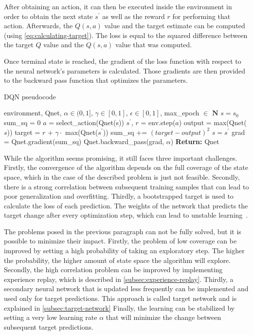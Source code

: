 \documentclass{article}
\begin{document}
After obtaining an action, it can then be executed inside the environment in order to obtain the next state $s^\prime$
as well as the reward $r$ for performing that action.
Afterwards, the $Q(s,a)$ value and the target estimate can be computed (using \autoref{eq:calculating-target}).
The loss is equal to the squared difference between the target $Q$ value and the $Q(s,a)$ value that was computed.

Once terminal state is reached, the gradient of the loss function with respect to the neural network's parameters is calculated.
Those gradients are then provided to the backward pass function that optimizes the parameters.


\begin{algorithm}
   \caption{DQN pseudocode}
   \begin{algorithmic}
      \REQUIRE environment, Qnet, $\alpha \in (0,1]$, $\gamma \in [0,1]$, $\epsilon \in [0,1]$, max\_epoch $\in$ $\mathbf{N}$
      \STATE $s = s_0$ 
         \STATE sum\_sq = 0
            \STATE $a$ = select\_action(Qnet(s))
            \STATE $s^\prime$, $r$ = env.step($a$)
            \STATE output = max(Qnet($s$))
            \STATE target = $r$ + $\gamma \cdot$ max(Qnet($s^\prime$))
            \STATE sum\_sq += $(target - output)^2$
            \STATE $s = s^\prime$
         \ENDWHILE
         \STATE grad = Qnet.gradient(sum\_sq)
         \STATE Qnet.backward\_pass(grad, $\alpha$)
      \ENDFOR
      \STATE \textbf{Return:} Qnet
   \end{algorithmic}
   \label{alg:dqn}
\end{algorithm}

While the algorithm seems promising, it still faces three important challenges.
Firstly, the convergence of the algorithm depends on the full coverage of the state space, which in the case of the described
problem is just not feasible.
Secondly, there is a strong correlation between subsequent training samples that can lead to poor generalization and overfitting.
Thirdly, a bootstrapped target is used to calculate the loss of each prediction.
The weights of the network that predicts the target change after every optimization step, which can lead to unstable learning~\cite{DBLP:books/sp/Plaat22}.

The problems posed in the previous paragraph can not be fully solved, but it is possible to minimize their impact.
Firstly, the problem of low coverage can be improved by setting a high probability of taking an exploratory step.
The higher the probability, the higher amount of state space the algorithm will explore.
Secondly, the high correlation problem can be improved by implementing experience replay, which is described in \autoref{subsec:experience-replay}.
Thirdly, a secondary neural network that is updated less frequently can be implemented and used only for target predictions.
This approach is called target network and is explained in \autoref{subsec:target-network}
Finally, the learning can be stabilized by setting a very low learning rate $\alpha$ that will minimize the change between
subsequent target predictions.
\end{document}

